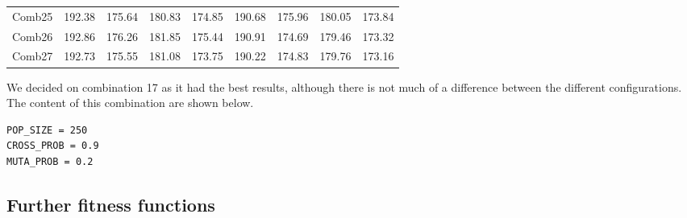 \begin{table}[H]
{\begin{tabular}{|c|c|c|c|c|c|c|c|c|}
        Comb25	& 192.38	& 175.64	& 180.83	& 174.85	& 190.68	& 175.96	& 180.05	& 173.84 \\

        Comb26	& 192.86	& 176.26	& 181.85	& 175.44	& 190.91	& 174.69	& 179.46	& 173.32 \\

        Comb27	& 192.73	& 175.55	& 181.08	& 173.75	& 190.22	& 174.83	& 179.76	& 173.16 \\
        \hline
    \end{tabular}
    }
\end{table}


We decided on combination 17 as it had the best results, although there is not much of a difference between the different configurations. The content of this combination are shown below.

\begin{lstlisting}[basicstyle=\small]
POP_SIZE = 250
CROSS_PROB = 0.9
MUTA_PROB = 0.2
\end{lstlisting}



\subsection{Further fitness functions}

